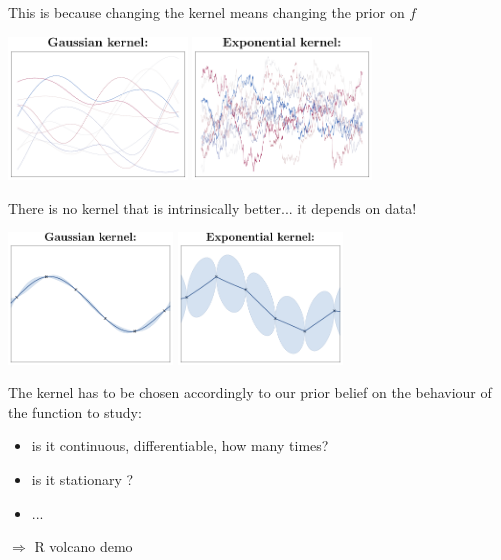 \documentclass{beamer}
\begin{document}
\begin{frame}{}
This is because changing the kernel means changing the prior on $f$\\
\vspace{5mm}
\begin{center}
\includegraphics[height=3.8cm]{figures/Fig2-sim-rbf} \qquad
\includegraphics[height=3.8cm]{figures/Fig2-sim-exp}
\end{center}
\end{frame}

\begin{frame}{}
There is no kernel that is intrinsically better... it depends on data!
\begin{center}
\includegraphics[height=3.5cm]{figures/Fig2-GP-rbf} \hspace{1cm}
\includegraphics[height=3.5cm]{figures/Fig2-GP-exp}
\end{center}
The kernel has to be chosen accordingly to our prior belief on the behaviour of the function to study:
\begin{itemize}
  \item is it continuous, differentiable, how many times?
  \item is it stationary ?
  \item ...
\end{itemize}
\vspace{5mm}
\alert{$\Rightarrow$ R volcano demo}
\end{frame}
\end{document}
